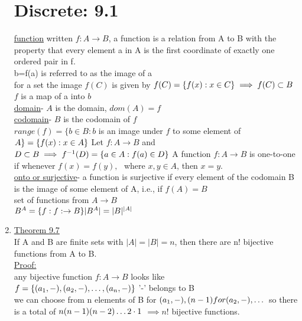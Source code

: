 \documentclass[12pt]{amsart}
\begin{document}
\begin{enumerate}
\section*{Discrete: 9.1}
\underline{function} written $f: A \rightarrow B$, a function is a relation from A to B with the property that every element a in A is the first coordinate of exactly one ordered pair in f.\\
b=f(a) is referred to as the image of a\\
for a set the image $f(C)$ is given by $f(C) = \{ f(x): x \in C \} \implies f(C) \subset B\\$
$f$ is a map of a into $b$\\
\underline{domain}- $A$ is the domain, $dom(A)=f$\\
\underline{codomain}- $B$ is the codomain of $f$\\
$range(f)=\{ b \in B : b$ is an image under $f$ to some element of $A \} = \{f(x): x \in A \}\\$
Let $f: A \rightarrow B$ and $D \subset B \implies f^{-1}(D) = \{a \in A: f(a) \in D \}\\$
A function $f : A \rightarrow B$ is one-to-one if whenever $f(x) = f(y),\,\,$ where $x,y \in A$, then $x=y$.\\
\underline{onto or surjective}- a function is surjective if every element of the codomain B is the image of some element of A, i.e., if $f(A)=B$\\
set of functions from $A \rightarrow B$\\
$B^A = \{ f: f: \rightarrow B \} \\
|B^A| = |B|^{|A|}$


\hdashrule[0.5ex][c]{\linewidth}{0.5pt}{1.5mm}


\item \underline{Theorem 9.7} \\ 
If A and B are finite sets with $|A| = |B|=n$, then there are n! bijective functions from A to B.\\
\underline{Proof:}\\
any bijective function $f: A \rightarrow B$ looks like\\
$f=\{(a_1,-),(a_2,-), \dots , (a_n,-) \}\\$
'-' belongs to B\\
we can choose from n elements of B for $(a_1,-), (n-1) for (a_2,-), \dots\\$
so there is a total of $n (n-1) (n-2) \dots 2 \cdot 1\\$
$\implies n!$ bijective functions.\\



\end{enumerate}
\end{document}
